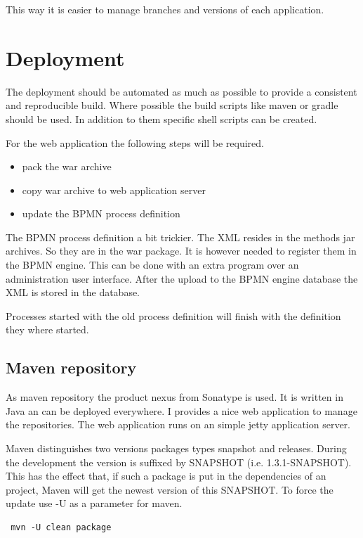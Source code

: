 \documentclass[paper=a4,twoside=false,BCOR=0mm,DIV=calc,fontsize=12pt]{scrartcl}
\begin{document}
This way it is easier to manage branches and versions of each application.



\section{Deployment}
The deployment should be automated as much as possible to provide a consistent and reproducible build.
Where possible the build scripts like maven or gradle should be used. 
In addition to them specific shell scripts can be created.

For the web application the following steps will be required.
\begin{itemize}
 \item pack the war archive
 \item copy war archive to web application server
 \item update the BPMN process definition
\end{itemize}

The BPMN process definition a bit trickier. The XML resides in the methods jar archives. So they are in the war package. It is however needed to register them in the BPMN engine. 
This can be done with an extra program over an administration user interface. After the upload to the BPMN engine database the XML is stored in the database.

Processes started with the old process definition will finish with the definition they where started.



\subsection{Maven repository}
As maven repository the product nexus \cite{nexus} from Sonatype is used. It is written in Java an can be deployed everywhere. I provides a nice web application to manage the repositories. The web application runs on an simple jetty \cite{jetty} application server.

Maven distinguishes two versions packages types snapshot and releases.
During the development the version is suffixed by SNAPSHOT (i.e. 1.3.1-SNAPSHOT).
This has the effect that, if such a package is put in the dependencies of an project, Maven will get the newest version of this SNAPSHOT. To force the update use -U as a parameter for maven.
\begin{verbatim}
 mvn -U clean package
\end{verbatim}
\end{document}
